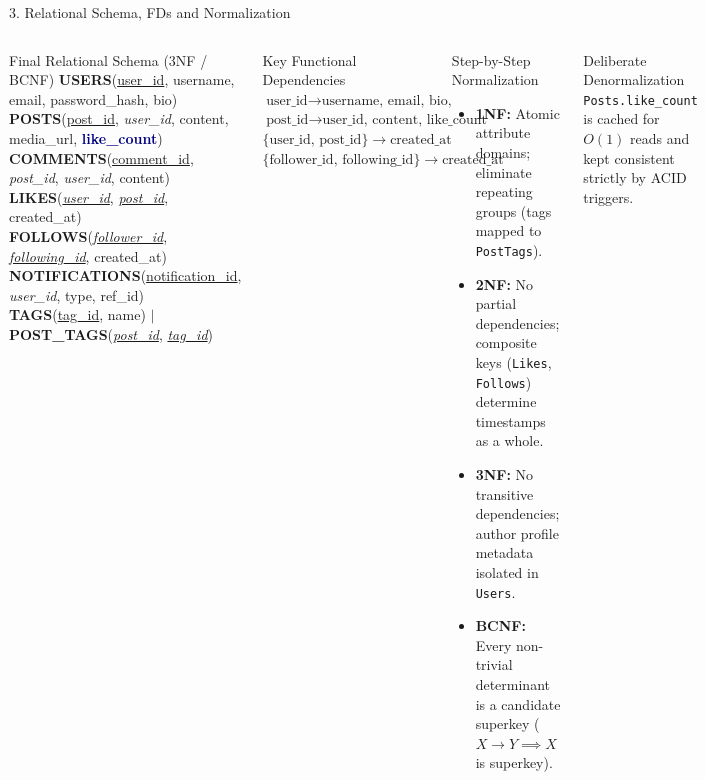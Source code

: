 \documentclass[aspectratio=169,10pt]{beamer}
\begin{document}
\begin{frame}{3. Relational Schema, FDs and Normalization}
\begin{columns}[T,onlytextwidth]
    \begin{block}{Final Relational Schema (3NF / BCNF)}
      \scriptsize
      \textbf{USERS}(\underline{user\_id}, username, email, password\_hash, bio)\\
      \textbf{POSTS}(\underline{post\_id}, \textit{user\_id}, content, media\_url, \textcolor{navy}{\textbf{like\_count}})\\
      \textbf{COMMENTS}(\underline{comment\_id}, \textit{post\_id}, \textit{user\_id}, content)\\
      \textbf{LIKES}(\underline{\textit{user\_id}}, \underline{\textit{post\_id}}, created\_at)\\
      \textbf{FOLLOWS}(\underline{\textit{follower\_id}}, \underline{\textit{following\_id}}, created\_at)\\
      \textbf{NOTIFICATIONS}(\underline{notification\_id}, \textit{user\_id}, type, ref\_id)\\
      \textbf{TAGS}(\underline{tag\_id}, name) $\mid$ \textbf{POST\_TAGS}(\underline{\textit{post\_id}}, \underline{\textit{tag\_id}})
    \end{block}
    \begin{block}{Key Functional Dependencies}
      \scriptsize
      $\text{user\_id} \rightarrow \text{username, email, bio, password\_hash}$\\
      $\text{post\_id} \rightarrow \text{user\_id, content, like\_count}$\\
      $\{\text{user\_id, post\_id}\} \rightarrow \text{created\_at}$\\
      $\{\text{follower\_id, following\_id}\} \rightarrow \text{created\_at}$
    \end{block}
    \begin{block}{Step-by-Step Normalization}
      \begin{itemize}
        \item \textbf{1NF:} Atomic attribute domains; eliminate repeating groups (tags mapped to \texttt{PostTags}).
        \item \textbf{2NF:} No partial dependencies; composite keys (\texttt{Likes}, \texttt{Follows}) determine timestamps as a whole.
        \item \textbf{3NF:} No transitive dependencies; author profile metadata isolated in \texttt{Users}.
        \item \textbf{BCNF:} Every non-trivial determinant is a candidate superkey ($X \rightarrow Y \implies X$ is superkey).
      \end{itemize}
    \end{block}
    \begin{block}{Deliberate Denormalization}
      \texttt{Posts.like\_count} is cached for $O(1)$ reads and kept consistent strictly by ACID triggers.
    \end{block}
\end{columns}
\end{frame}
\end{document}
